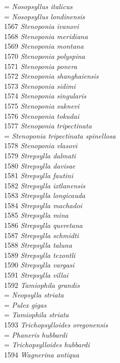 \documentclass[
]{article}
\begin{document}
= \emph{Nosopsyllus italicus}\\
= \emph{Nosopsyllus londinensis}\\
1567 \emph{Stenoponia ivanovi}\\
1568 \emph{Stenoponia meridiana}\\
1569 \emph{Stenoponia montana}\\
1570 \emph{Stenoponia polyspina}\\
1571 \emph{Stenoponia ponera}\\
1572 \emph{Stenoponia shanghaiensis}\\
1573 \emph{Stenoponia sidimi}\\
1574 \emph{Stenoponia singularis}\\
1575 \emph{Stenoponia suknevi}\\
1576 \emph{Stenoponia tokudai}\\
1577 \emph{Stenoponia tripectinata}\\
= \emph{Stenoponia tripectinata spinellosa}\\
1578 \emph{Stenoponia vlasovi}\\
1579 \emph{Strepsylla dalmati}\\
1580 \emph{Strepsylla davisae}\\
1581 \emph{Strepsylla fautini}\\
1582 \emph{Strepsylla ixtlanensis}\\
1583 \emph{Strepsylla longicauda}\\
1584 \emph{Strepsylla machadoi}\\
1585 \emph{Strepsylla mina}\\
1586 \emph{Strepsylla queretana}\\
1587 \emph{Strepsylla schmidti}\\
1588 \emph{Strepsylla taluna}\\
1589 \emph{Strepsylla tezontli}\\
1590 \emph{Strepsylla vargasi}\\
1591 \emph{Strepsylla villai}\\
1592 \emph{Tamiophila grandis}\\
= \emph{Neopsylla striata}\\
= \emph{Pulex gigas}\\
= \emph{Tamiophila striata}\\
1593 \emph{Trichopsylloides oregonensis}\\
= \emph{Phaneris hubbardi}\\
= \emph{Trichopsylloides hubbardi}\\
1594 \emph{Wagnerina antiqua}\\
\end{document}
